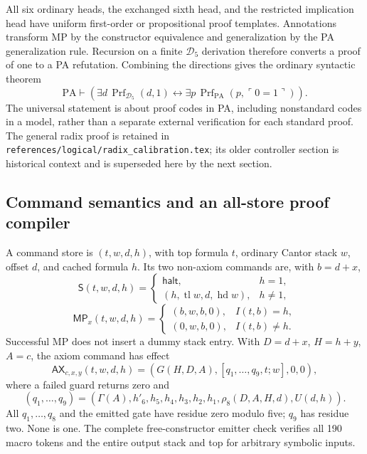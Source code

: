 All six ordinary heads, the exchanged sixth head, and the restricted
implication head have uniform first-order or propositional proof
templates. Annotations transform MP by the constructor equivalence and
generalization by the PA generalization rule. Recursion on a finite
$\mathcal D_5$ derivation therefore converts a proof of one to a PA
refutation. Combining the directions gives the ordinary syntactic theorem
\[
 \mathrm{PA}\vdash
 \left(\exists d\,\operatorname{Prf}_{\mathcal D_5}(d,1)
  \leftrightarrow\exists p\,\operatorname{Prf}_{\mathrm{PA}}(p,\ulcorner0=1\urcorner)\right).
 \tag{C5}
\]
The universal statement is about proof codes in PA, including nonstandard
codes in a model, rather than a separate external verification for each
standard proof. The general radix proof is retained in
\texttt{references/logical/radix\_calibration.tex}; its older controller
section is historical context and is superseded here by the next section.

\subsection{Command semantics and an all-store proof compiler}

A command store is $(t,w,d,h)$, with top formula $t$, ordinary Cantor
stack $w$, offset $d$, and cached formula $h$. Its two non-axiom commands
are, with $b=d+x$,
\[
 \mathsf S(t,w,d,h)=
 \begin{cases}\mathsf{halt},&h=1,\\
 (h,\operatorname{tl}w,d,\operatorname{hd}w),&h\ne1,
 \end{cases}
\]
\[
 \mathsf{MP}_x(t,w,d,h)=
 \begin{cases}(b,w,b,0),&I(t,b)=h,\\
 (0,w,b,0),&I(t,b)\ne h.
 \end{cases}
\]
Successful MP does not insert a dummy stack entry. With $D=d+x$,
$H=h+y$, $A=c$, the axiom command has effect
\[
 \mathsf{AX}_{c,x,y}(t,w,d,h)=
 (G(H,D,A),[q_1,\ldots,q_9,t;w],0,0),
\]
where a failed guard returns zero and
\[
 (q_1,\ldots,q_9)=
 (\Gamma(A),h'_6,h_5,h_4,h_3,h_2,h_1,
                        \rho_8(D,A,H,d),U(d,h)).
\]
All $q_1,\ldots,q_8$ and the emitted gate have residue zero modulo five;
$q_9$ has residue two. None is one. The complete free-constructor emitter
check verifies all 190 macro tokens and the entire output stack and top
for arbitrary symbolic inputs.

